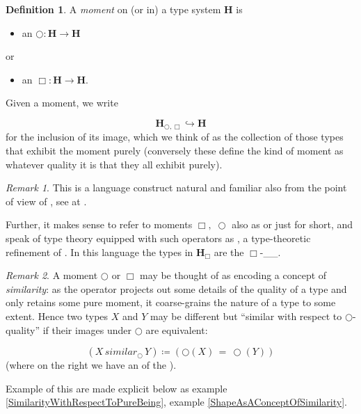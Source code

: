 \documentclass[12pt,titlepage]{article}
\theoremstyle{plain}
\theoremstyle{definition}
\newtheorem{defn}{Definition}
\theoremstyle{remark}
\newtheorem{remark}{Remark}
\begin{document}
\begin{defn}
\label{Moments}\hypertarget{Moments}{}
A \emph{moment} on (or in) a type system $\mathbf{H}$ is

\begin{itemize}%
\item an  $\bigcirc \colon \mathbf{H} \to \mathbf{H}$

\end{itemize}
or

\begin{itemize}%
\item an  $\Box \colon \mathbf{H} \to \mathbf{H}$.

\end{itemize}
Given a moment, we write

\begin{displaymath}
\mathbf{H}_{\bigcirc, \Box} \hookrightarrow \mathbf{H}
\end{displaymath}
for the inclusion of its image, which we think of as the collection of those types that exhibit the moment purely (conversely these define the kind of moment as whatever quality it is that they all exhibit purely).

\end{defn}
\begin{remark}
\label{}\hypertarget{}{}
This is a language construct natural and familiar also from the point of view of , see at \emph{}.

Further, it makes sense to refer to moments $\Box,\;\bigcirc$ also as \emph{} or just \emph{} for short, and speak of type theory equipped with such operators as \emph{}, a type-theoretic refinement of . In this language the types in $\mathbf{H}_{\Box}$ are the $\Box$-\_\_.

\end{remark}
\begin{remark}
\label{MomentsAndSimilarity}\hypertarget{MomentsAndSimilarity}{}
A moment $\bigcirc$ or $\Box$ may be thought of as encoding a concept of \emph{similarity}: as the operator projects out some details of the quality of a type and only retains some pure moment, it coarse-grains the nature of a type to some extent. Hence two types $X$ and $Y$ may be different but ``similar with respect to $\bigcirc$-quality'' if their images under $\bigcirc$ are equivalent:

\begin{displaymath}
(X \,similar_{\bigcirc}\, Y)
  \coloneqq
  (\bigcirc(X) \,= \, \bigcirc(Y))
\end{displaymath}
(where on the right we have an  of the ).

\end{remark}
Example of this are made explicit below as example \ref{SimilarityWithRespectToPureBeing}, example \ref{ShapeAsAConceptOfSimilarity}.
\end{document}
